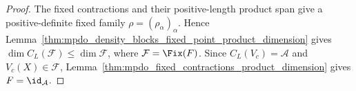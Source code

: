 \begin{proof}\leanok
    The fixed contractions and their positive-length product span give a
    positive-definite fixed family $\rho=(\rho_\alpha)_\alpha$. Hence
    Lemma~\ref{thm:mpdo_density_blocks_fixed_point_product_dimension}
    gives
    $\dim C_L(\mathcal F)\leq\dim\mathcal F$, where
    $\mathcal F=\Fix(F)$.
    Since $C_L(V_c)=\mathcal A$ and $V_c(X)\in\mathcal F$,
    Lemma~\ref{thm:mpdo_fixed_contractions_product_dimension} gives $F=\id_{\mathcal A}$.
\end{proof}
